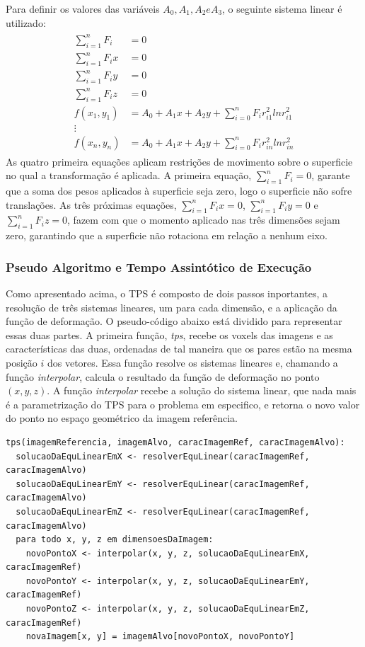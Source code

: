 Para definir os valores das variáveis $A_0, A_1, A_2 e A_3$, o seguinte sistema
linear é utilizado:
\begin{align}
\begin{split}
    \sum_{i=1}^n F_i &= 0 \\
    \sum_{i=1}^n F_ix &= 0 \\
    \sum_{i=1}^n F_iy &= 0 \\
    \sum_{i=1}^n F_iz &= 0 \\
    f(x_1,y_1) &= A_0 + A_1x + A_2y + \sum_{i=0}^n F_i r_{i1}^2 ln r_{i1}^2 \\
    \vdots \\
    f(x_n,y_n) &= A_0 + A_1x + A_2y + \sum_{i=0}^n F_i r_{in}^2 ln r_{in}^2
\end{split}
\end{align}
  As quatro primeira equações aplicam restrições de movimento sobre o superficie no qual
a transformação é aplicada. A primeira equação, $\sum_{i=1}^n F_i = 0$, garante que
a soma dos pesos aplicados à superficie seja zero, logo o superficie não sofre translações.
As três próximas equações, $\sum_{i=1}^n F_ix = 0$, $\sum_{i=1}^n F_iy = 0$ e
$\sum_{i=1}^n F_iz = 0$, fazem com que o momento aplicado nas três dimensões sejam
zero, garantindo que a superficie não rotaciona em relação a nenhum eixo.

\subsubsection{Pseudo Algoritmo e Tempo Assintótico de Execução}

  Como apresentado acima, o TPS é composto de dois passos inportantes, a resolução
de três sistemas lineares, um para cada dimensão, e a aplicação da função de
deformação. O pseudo-código abaixo está dividido para representar essas duas partes.
A primeira função, \textit{tps}, recebe os voxels das imagens e as características
das duas, ordenadas de tal maneira que os pares estão na mesma posição $i$ dos
vetores. Essa função resolve os sistemas lineares e, chamando a função
\textit{interpolar}, calcula o resultado da função de deformação no ponto
$(x, y, z)$. A função \textit{interpolar} recebe a solução do sistema linear,
que nada mais é a parametrização do TPS para o problema em especifico, e retorna
o novo valor do ponto no espaço geométrico da imagem referência.

\begin{lstlisting}[mathescape]
tps(imagemReferencia, imagemAlvo, caracImagemRef, caracImagemAlvo):
  solucaoDaEquLinearEmX <- resolverEquLinear(caracImagemRef, caracImagemAlvo)
  solucaoDaEquLinearEmY <- resolverEquLinear(caracImagemRef, caracImagemAlvo)
  solucaoDaEquLinearEmZ <- resolverEquLinear(caracImagemRef, caracImagemAlvo)
  para todo x, y, z em dimensoesDaImagem:
    novoPontoX <- interpolar(x, y, z, solucaoDaEquLinearEmX, caracImagemRef)
    novoPontoY <- interpolar(x, y, z, solucaoDaEquLinearEmY, caracImagemRef)
    novoPontoZ <- interpolar(x, y, z, solucaoDaEquLinearEmZ, caracImagemRef)
    novaImagem[x, y] = imagemAlvo[novoPontoX, novoPontoY]
\end{lstlisting}


